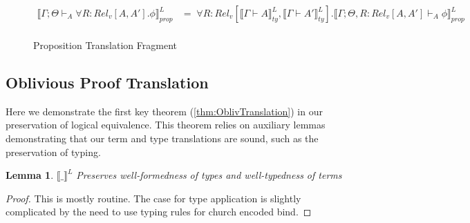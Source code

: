 \documentclass[acmsmall]{acmart}
\newcommand{\den}[1]{\llbracket #1\rrbracket}
\newtheorem*{lemma*}{Lemma}
\begin{document}
\begin{figure}[H]
\begin{align*}
    \den{\Gamma;\Theta\vdash_A \forall R:Rel_v[A,A'].\phi}^L_{prop} &=\;   \forall  R:Rel_v[\den{\Gamma \vdash A}^L_{ty},\den{\Gamma \vdash A'}^L_{ty}].\den{\Gamma;\Theta,R:Rel_v[A,A']\vdash_A \phi}^L_{prop}\\
    \end{align*}
    \caption{Proposition Translation Fragment}
    \label{fig:PropTranslation}
\end{figure}




  
\subsection{Oblivious Proof Translation}\label{sec:ProofTranslation}
Here we demonstrate the first key theorem (\cref{thm:OblivTranslation}) in our preservation of logical equivalence. This theorem relies on auxiliary lemmas demonstrating that our term and type translations are sound, such as the preservation of typing.

\begin{lemma*} $\den{\_}^L$ Preserves well-formedness of types and well-typedness of terms
  \end{lemma*}

\begin{proof}
  This is mostly routine. The case for type application is slightly complicated by the need to use typing rules for church encoded bind.
\end{proof}

\end{document}
